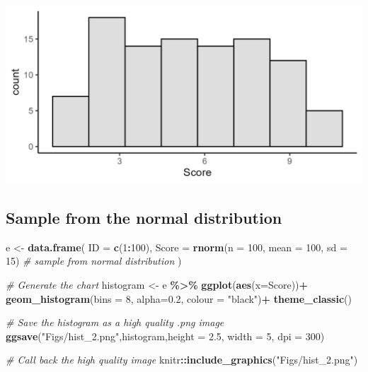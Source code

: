 \documentclass[
]{book}
\newenvironment{Shaded}{\begin{snugshade}}{\end{snugshade}}
\newcommand{\AttributeTok}[1]{\textcolor[rgb]{0.13,0.29,0.53}{#1}}
\newcommand{\CommentTok}[1]{\textcolor[rgb]{0.56,0.35,0.01}{\textit{#1}}}
\newcommand{\DecValTok}[1]{\textcolor[rgb]{0.00,0.00,0.81}{#1}}
\newcommand{\FloatTok}[1]{\textcolor[rgb]{0.00,0.00,0.81}{#1}}
\newcommand{\FunctionTok}[1]{\textcolor[rgb]{0.13,0.29,0.53}{\textbf{#1}}}
\newcommand{\NormalTok}[1]{#1}
\newcommand{\OtherTok}[1]{\textcolor[rgb]{0.56,0.35,0.01}{#1}}
\newcommand{\SpecialCharTok}[1]{\textcolor[rgb]{0.81,0.36,0.00}{\textbf{#1}}}
\newcommand{\StringTok}[1]{\textcolor[rgb]{0.31,0.60,0.02}{#1}}
\begin{document}
\includegraphics[width=20.83in]{Figs/hist_1}

\subsection*{Sample from the normal distribution}\label{sample-from-the-normal-distribution}

\begin{Shaded}
\begin{Highlighting}[]
\NormalTok{e }\OtherTok{\textless{}{-}} \FunctionTok{data.frame}\NormalTok{(}
  \AttributeTok{ID =} \FunctionTok{c}\NormalTok{(}\DecValTok{1}\SpecialCharTok{:}\DecValTok{100}\NormalTok{),}
  \AttributeTok{Score =} \FunctionTok{rnorm}\NormalTok{(}\AttributeTok{n =} \DecValTok{100}\NormalTok{, }\AttributeTok{mean =} \DecValTok{100}\NormalTok{, }\AttributeTok{sd =} \DecValTok{15}\NormalTok{) }\CommentTok{\# sample from normal distribution}
\NormalTok{)}

\CommentTok{\# Generate the chart}
\NormalTok{histogram }\OtherTok{\textless{}{-}}\NormalTok{ e }\SpecialCharTok{\%\textgreater{}\%}
  \FunctionTok{ggplot}\NormalTok{(}\FunctionTok{aes}\NormalTok{(}\AttributeTok{x=}\NormalTok{Score))}\SpecialCharTok{+}
  \FunctionTok{geom\_histogram}\NormalTok{(}\AttributeTok{bins =} \DecValTok{8}\NormalTok{, }\AttributeTok{alpha=}\FloatTok{0.2}\NormalTok{, }\AttributeTok{colour =} \StringTok{"black"}\NormalTok{)}\SpecialCharTok{+}
  \FunctionTok{theme\_classic}\NormalTok{()}

\CommentTok{\# Save the histogram as a high quality .png image}
\FunctionTok{ggsave}\NormalTok{(}\StringTok{"Figs/hist\_2.png"}\NormalTok{,histogram,}\AttributeTok{height =} \FloatTok{2.5}\NormalTok{, }\AttributeTok{width =} \DecValTok{5}\NormalTok{, }\AttributeTok{dpi =} \DecValTok{300}\NormalTok{)}

\CommentTok{\# Call back the high quality image }
\NormalTok{knitr}\SpecialCharTok{::}\FunctionTok{include\_graphics}\NormalTok{(}\StringTok{"Figs/hist\_2.png"}\NormalTok{)}
\end{Highlighting}
\end{Shaded}
\end{document}
